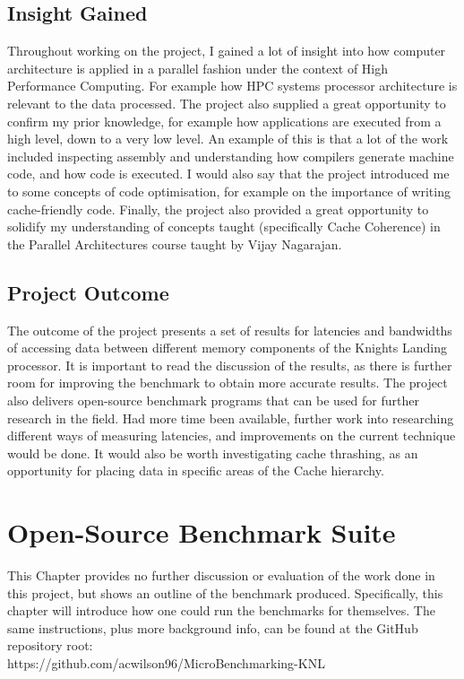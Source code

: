 \documentclass[bsc,frontabs,twoside,singlespacing,parskip,deptreport]{infthesis}     %
\begin{document}
\section{Insight Gained}
Throughout working on the project, I gained a lot of insight into how computer architecture is applied in a parallel fashion under the context of High Performance Computing. For example how HPC systems processor architecture is relevant to the data processed. The project also supplied a great opportunity to confirm my prior knowledge, for example how applications are executed from a high level, down to a very low level. An example of this is that a lot of the work included inspecting assembly and understanding how compilers generate machine code, and how code is executed. I would also say that the project introduced me to some concepts of code optimisation, for example on the importance of writing cache-friendly code. Finally, the project also provided a great opportunity to solidify my understanding of concepts taught (specifically Cache Coherence) in the Parallel Architectures course taught by Vijay Nagarajan.

\section{Project Outcome}
The outcome of the project presents a set of results for latencies and bandwidths of accessing data between different memory components of the Knights Landing processor. It is important to read the discussion of the results, as there is further room for improving the benchmark to obtain more accurate results. The project also delivers open-source benchmark programs that can be used for further research in the field. Had more time been available, further work into researching different ways of measuring latencies, and improvements on the current technique would be done. It would also be worth investigating cache thrashing, as an opportunity for placing data in specific areas of the Cache hierarchy.

\chapter{Open-Source Benchmark Suite}\label{chap:benchmark-suite}
This Chapter provides no further discussion or evaluation of the work done in this project, but shows an outline of the benchmark produced. Specifically, this chapter will introduce how one could run the benchmarks for themselves. The same instructions, plus more background info, can be found at the GitHub repository root: \\
https://github.com/acwilson96/MicroBenchmarking-KNL
\end{document}
